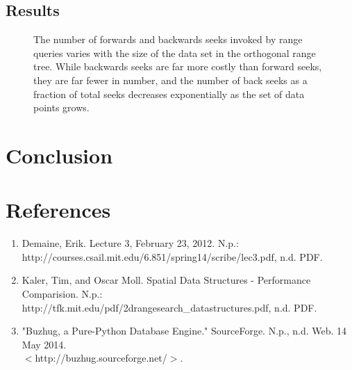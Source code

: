 \documentclass[11pt, oneside]{article}
\begin{document}
\subsection{Results}

\begin{figure}[b!]
\centering
{}%
\caption{
    The number of forwards and backwards seeks invoked by range queries varies
    with the size of the data set in the orthogonal range tree. While
    backwards seeks are far more costly than forward seeks, they are far
    fewer in number, and the number of back seeks as a fraction of total seeks
    decreases exponentially as the set of data points grows.
}
\label{fig:figure2}
\end{figure}

\section{Conclusion}




\section{References}

\begin{enumerate}[1.]
\item Demaine, Erik. Lecture 3, February 23, 2012. N.p.: \\ http://courses.csail.mit.edu/6.851/spring14/scribe/lec3.pdf, n.d. PDF.

\item Kaler, Tim, and Oscar Moll. Spatial Data Structures - Performance Comparision. N.p.: \\ http://tfk.mit.edu/pdf/2drangesearch\_datastructures.pdf, n.d. PDF.

\item "Buzhug, a Pure-Python Database Engine." SourceForge. N.p., n.d. Web. 14 May 2014. \\ $<$http://buzhug.sourceforge.net/$>$.


\end{enumerate}
\end{document}

